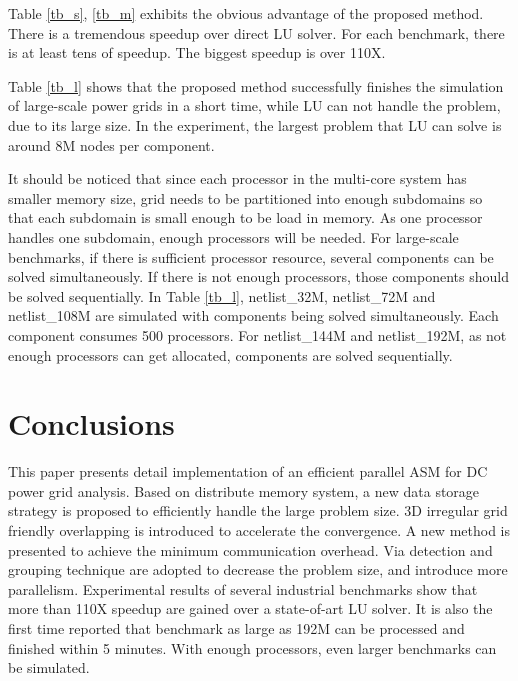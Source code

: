 \documentclass{sig-alternate}
\begin{document}
	Table \ref{tb_s}, \ref{tb_m} exhibits the obvious advantage of the proposed method. There is a tremendous 
	speedup over direct LU solver. For each benchmark, there is at least tens of speedup. The biggest speedup is over 110X. 

	Table \ref{tb_l} shows that the proposed method successfully finishes the simulation of large-scale power grids
	in a short time, while LU can not handle the problem, due to its large size. In the experiment, the largest problem that LU can solve is 
	around 8M nodes per component. 

	It should be noticed that since each processor in the multi-core system has smaller memory size, grid needs to be 
	partitioned into enough subdomains so that each subdomain is small enough to be load in memory. As one processor handles one 
	subdomain, enough processors will be needed. For large-scale benchmarks, if there is sufficient processor resource, several 
	components can be solved simultaneously. If there is not enough processors, those components should be 
	solved sequentially. In Table \ref{tb_l}, netlist\_32M, netlist\_72M and netlist\_108M are 
	simulated with components being solved simultaneously. Each component consumes 500 processors. For netlist\_144M and 
	netlist\_192M, as not enough processors can get allocated, components are solved sequentially.

\section{Conclusions}
	This paper presents detail implementation of an efficient parallel ASM for DC power grid analysis. Based on distribute memory 
	system, a new data storage strategy is proposed to efficiently handle the large problem size. 3D irregular grid 
	friendly overlapping 
	is introduced to accelerate the convergence. A new method is presented to achieve the minimum communication overhead. Via 
	detection and grouping technique are adopted to decrease the problem size, and introduce more parallelism. Experimental 
	results of several industrial benchmarks show that more than 110X speedup are gained over a state-of-art LU solver. It is also 
	the first time reported that benchmark as large as 192M can be processed and finished within 5 minutes. With enough processors, 
	even larger benchmarks can be simulated.



\end{document}
